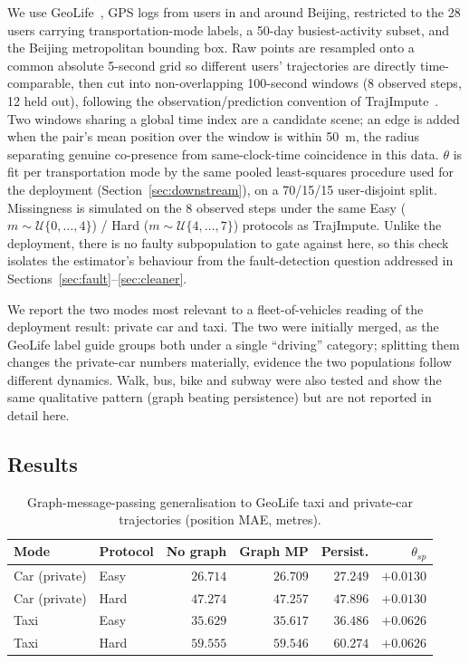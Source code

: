 \documentclass[conference]{IEEEtran}
\begin{document}
We use GeoLife~\cite{zheng2010geolife}, GPS logs from users in and around
Beijing, restricted to the 28 users carrying transportation-mode labels, a
50-day busiest-activity subset, and the Beijing metropolitan bounding box.
Raw points are resampled onto a common absolute 5-second grid so different
users' trajectories are directly time-comparable, then cut into
non-overlapping 100-second windows (8 observed steps, 12 held out), following
the observation/prediction convention of
TrajImpute~\cite{chib2024trajimpute}. Two windows sharing a global time index
are a candidate scene; an edge is added when the pair's mean position over the
window is within 50~m, the radius separating genuine co-presence from
same-clock-time coincidence in this data. $\theta$ is fit per transportation
mode by the same pooled least-squares procedure used for the deployment
(Section~\ref{sec:downstream}), on a 70/15/15 user-disjoint split. Missingness
is simulated on the 8 observed steps under the same Easy
($m \sim \mathcal{U}\{0,\ldots,4\}$) / Hard ($m \sim \mathcal{U}\{4,\ldots,7\}$)
protocols as TrajImpute. Unlike the deployment, there is no faulty
subpopulation to gate against here, so this check isolates the estimator's
behaviour from the fault-detection question addressed in
Sections~\ref{sec:fault}--\ref{sec:cleaner}.

We report the two modes most relevant to a fleet-of-vehicles reading of the
deployment result: private car and taxi. The two were initially merged, as
the GeoLife label guide groups both under a single ``driving'' category;
splitting them changes the private-car numbers materially, evidence the two
populations follow different dynamics. Walk, bus, bike and subway were also
tested and show the same qualitative pattern (graph beating persistence) but
are not reported in detail here.

\subsection{Results}

\begin{table}[t]
\caption{Graph-message-passing generalisation to GeoLife taxi and
private-car trajectories (position MAE, metres).}
\label{tab:geolife}
\centering
\begin{tabular}{llrrrr}
\toprule
Mode & Protocol & No graph & Graph MP & Persist. & $\theta_{sp}$ \\
\midrule
Car (private) & Easy & $26.714$ & $\mathbf{26.709}$ & $27.249$ & $+0.0130$ \\
Car (private) & Hard & $47.274$ & $\mathbf{47.257}$ & $47.896$ & $+0.0130$ \\
Taxi          & Easy & $35.629$ & $\mathbf{35.617}$ & $36.486$ & $+0.0626$ \\
Taxi          & Hard & $59.555$ & $\mathbf{59.546}$ & $60.274$ & $+0.0626$ \\
\bottomrule
\end{tabular}
\end{table}
\end{document}
